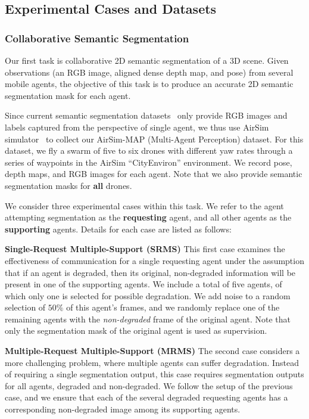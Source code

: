 \subsection{Experimental Cases and Datasets}

\subsubsection{Collaborative Semantic Segmentation}

Our first task is collaborative 2D semantic segmentation of a 3D scene. Given observations (an RGB image, aligned dense depth map, and pose) from several mobile agents, the objective of this task is to produce an accurate 2D semantic segmentation mask for each agent.

Since current semantic segmentation datasets~\cite{geiger2013vision,cordts2016cityscapes,RobotCarDatasetIJRR,hecker2018end} only provide RGB images and labels captured from the perspective of single agent, we thus use AirSim simulator~\cite{airsim2017fsr} to collect our AirSim-MAP (Multi-Agent Perception) dataset.
For this dataset, we fly a swarm of five to six drones with different yaw rates through a series of waypoints in the AirSim ``CityEnviron'' environment. 
We record pose, depth maps, and RGB images for each agent. Note that we also provide semantic segmentation masks for \textbf{all} drones.  

We consider three experimental cases within this task.  We refer to the agent attempting segmentation as the \textbf{requesting} agent, and all other agents as the \textbf{supporting} agents.  Details for each case are listed as follows: 

\noindent
\textbf{Single-Request Multiple-Support (SRMS)} 
This first case examines the effectiveness of communication for a single requesting agent under the assumption that if an agent is degraded, then its original, non-degraded information will be present in one of the supporting agents.  We include a total of five agents, of which only one is selected for possible degradation.  We add noise to a random selection of $50\%$ of this agent's frames, and we randomly replace one of the remaining agents with the \textit{non-degraded} frame of the original agent.  Note that only the segmentation mask of the original agent is used as supervision.  

\noindent
\textbf{Multiple-Request Multiple-Support (MRMS)}
The second case considers a more challenging problem, where multiple agents can suffer degradation.  Instead of requiring a single segmentation output, this case requires segmentation outputs for all agents, degraded and non-degraded.  We follow the setup of the previous case, and we ensure that each of the several degraded requesting agents has a corresponding non-degraded image among its supporting agents.  

